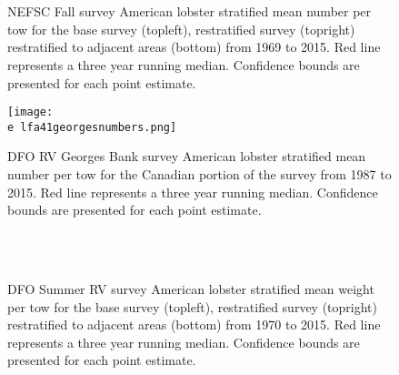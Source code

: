\documentclass[11pt]{article}
\newcommand{\e}{/backup/bio_data/bio.lobster/figures/} %
\begin{document}
\begin{figure}
\centering
{}
\\
\\

\caption{NEFSC Fall survey American lobster stratified mean number per tow for the base survey (topleft), restratified survey (topright) restratified to adjacent areas (bottom) from 1969 to 2015. Red line represents a three year running median. Confidence bounds are presented for each point estimate. }
\end{figure}
\clearpage

\begin{figure}

    \texttt{[image: \\e lfa41georgesnumbers.png]}
    \caption{DFO RV Georges Bank survey American lobster stratified mean number per tow for the Canadian portion of the survey from 1987 to 2015. Red line represents a three year running median. Confidence bounds are presented for each point estimate.}

\end{figure}


\begin{figure}
\centering
{}
\\
\\

\caption{DFO Summer RV survey American lobster stratified mean weight per tow for the base survey (topleft), restratified survey (topright) restratified to adjacent areas (bottom) from 1970 to 2015. Red line represents a three year running median. Confidence bounds are presented for each point estimate.}
\end{figure}
\clearpage
\end{document}
